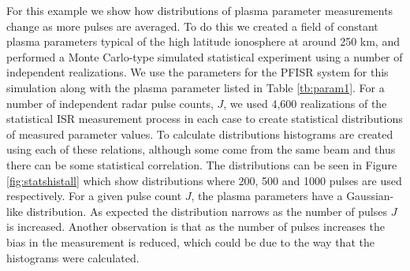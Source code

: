 For this example we show how distributions of plasma parameter measurements change as more pulses are averaged. To do this we created a field of constant plasma parameters typical of the high latitude ionosphere at around 250 km, and performed a Monte Carlo-type simulated statistical experiment using a number of independent realizations. We use the parameters for the PFISR system for this simulation along with the plasma parameter listed in Table \ref{tb:param1}. For a number of independent radar pulse counts, $J$, we used 4,600 realizations of the statistical ISR measurement process in each case to create statistical distributions of measured parameter values. To calculate distributions histograms are created using each of these relations, although some come from the same beam and thus there can be some statistical correlation. The distributions can be seen in Figure \ref{fig:statshistall} which show distributions where 200, 500 and 1000 pulses are used respectively. For a given pulse count $J$, the plasma parameters have a Gaussian-like distribution. As expected the distribution narrows as the number of pulses $J$ is increased. Another observation is that as the number of pulses increases the bias in the measurement is reduced, which could be due to the way that the histograms were calculated.

